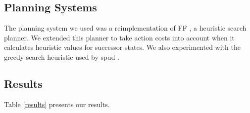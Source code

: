 


\subsection{Planning Systems}
The planning system we used was a reimplementation of {\sc FF} \cite{hoffmannnebel2001}, a heuristic search planner. We extended this planner to take action costs into account when it calculates heuristic values for successor states. We also experimented with the greedy search heuristic used by {\sc spud} \cite{stonedoran1997}. 

\subsection{Results}
Table \ref{results} presents our results.

